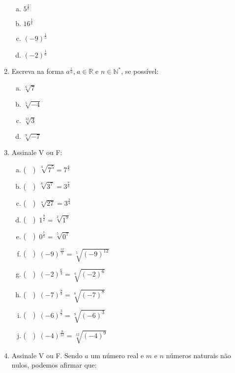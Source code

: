 \documentclass[a4paper,14pt]{article}
\begin{document}
\begin{multicols}{2}
\begin{enumerate}
\begin{enumerate}[a)]
        	\item $5^\frac{1}{8}$ \\
        	\item $16^\frac{1}{4}$\\
        	\item $(-9)^\frac{1}{5}$\\
        	\item $(-2)^\frac{1}{6}$\\
        \end{enumerate}
        \item Escreva na forma $a^\frac{1}{n}$,$~a \in \mathbb{R}$ e $n \in \mathbb{N^*}$, se possível:
        \begin{enumerate}[a)]
        	\item $\sqrt[6]{7}$\\
        	\item $\sqrt[5]{-4}$\\
        	\item $\sqrt[12]{3}$\\
        	\item $\sqrt[8]{-7}$\\
        \end{enumerate}
        \item Assinale V ou F:
        \begin{enumerate}[a)]
        	\item (~~)~$\sqrt[4]{7^5} = 7^\frac{4}{5}$
        	\item (~~)~$\sqrt[6]{3^7} = 3^\frac{7}{6}$
        	\item (~~)~$\sqrt[4]{27} = 3^\frac{3}{4}$
        	\item (~~)~$1^\frac{9}{2} = \sqrt[2]{1^9}$
        	\item (~~)~$0^\frac{7}{5} = \sqrt[5]{0^7}$
        	\item (~~)~$(-9)^\frac{12}{5} = \sqrt[5]{(-9)^12}$
        	\item (~~)~$(-2)^\frac{6}{4} = \sqrt[4]{(-2)^6}$
        	\item (~~)~$(-7)^\frac{8}{8} = \sqrt[8]{(-7)^8}$
        	\item (~~)~$(-6)^\frac{3}{9} = \sqrt[9]{(-6)^3}$
        	\item (~~)~$(-4)^\frac{9}{12} = \sqrt[12]{(-4)^9}$
        \end{enumerate}	
        \item Assinale V ou F. Sendo $a$ um número real e $m$ e $n$ números naturais não nulos, podemos afirmar que:
        \begin{enumerate}[a)]

\end{enumerate}
\end{enumerate}
\end{multicols}
\end{document}
